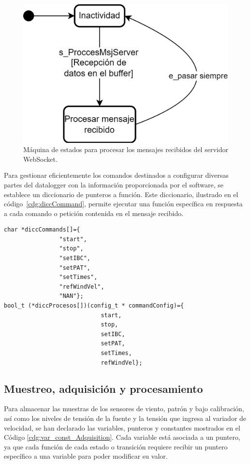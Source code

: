 \begin{figure}[H]
    \centering
    \includegraphics[width=0.5\linewidth]{Figuras/datalogger/Firmware/sc_processComand.png}
    \caption{Máquina de estados para procesar los mensajes recibidos del servidor WebSocket.}
    \label{fig:processComand}
\end{figure}

Para gestionar eficientemente los comandos destinados a configurar diversas partes del datalogger con la información proporcionada por el software, se establece un diccionario de punteros a función. Este diccionario, ilustrado en el código~\ref{cdg:diccCommand}, permite ejecutar una función específica en respuesta a cada comando o petición contenida en el mensaje recibido.

\begin{lstlisting}[style=cstyle, caption={Funciones que permiten configurar o modificar el comportamiento del dataloger.}, label=cdg:diccCommand,basicstyle=\ttfamily\fontsize{8}{8}\selectfont]
char *diccCommands[]={
				"start",
				"stop",
				"setIBC",
				"setPAT",
				"setTimes",
				"refWindVel",
				"NAN"};
bool_t (*diccProcesos[])(config_t * commandConfig)={
							start,
							stop,
							setIBC,
							setPAT,
							setTimes,
							refWindVel};

\end{lstlisting}


\subsection{Muestreo, adquisición y procesamiento}\label{sec:muestreo_adquisicion_procesamiento}

Para almacenar las muestras de los sensores de viento, patrón y bajo calibración, así como los niveles de tensión de la fuente y la tensión que ingresa al variador de velocidad, se han declarado las variables, punteros y constantes mostrados en el Código \ref{cdg:var_const_Adquisition}. Cada variable está asociada a un puntero, ya que cada función de cada estado o transición requiere recibir un puntero específico a una variable para poder modificar su valor.

